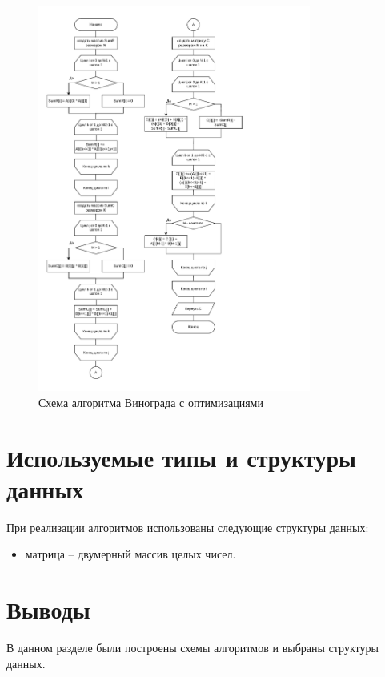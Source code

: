 \begin{figure}[h!]
	\centering
	\includegraphics[height=0.8\textheight, width=0.8\textwidth]{tex_parts/scheme4.pdf}
	\caption{\label{fig:vio}Схема алгоритма Винограда с оптимизациями}
\end{figure}

\clearpage

\section{Используемые типы и структуры данных}

При реализации алгоритмов использованы следующие структуры данных:

\begin{itemize}
	\item матрица -- двумерный массив целых чисел.
\end{itemize}

\section{Выводы}

В данном разделе были построены схемы алгоритмов и выбраны структуры данных.

